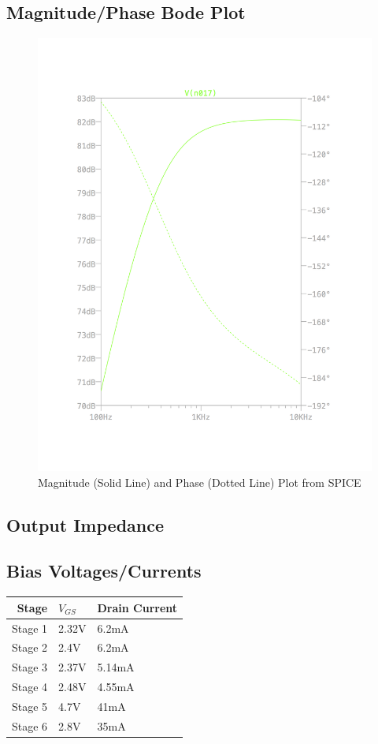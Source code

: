 \documentclass[11pt, twoside, letterpaper]{article}
\begin{document}
\subsection*{Magnitude/Phase Bode Plot}
\begin{figure}[htbp]
\begin{center}
\includegraphics[width=7in]{MagPlot.png}
\caption{Magnitude (Solid Line) and Phase (Dotted Line) Plot from SPICE}
\end{center}
\end{figure}
\FloatBarrier

\subsection*{Output Impedance}
\subsection*{Bias Voltages/Currents}
\begin{tabular}{|r|l|l|}
\hline
Stage & $V_{GS}$ & Drain Current\\
\hline
Stage 1 &2.32V&6.2mA\\
Stage 2 &2.4V&6.2mA\\
Stage 3 &2.37V&5.14mA\\
Stage 4 &2.48V&4.55mA\\
Stage 5 &4.7V&41mA\\
Stage 6 &2.8V&35mA\\
\hline
\end{tabular}
\end{document}
